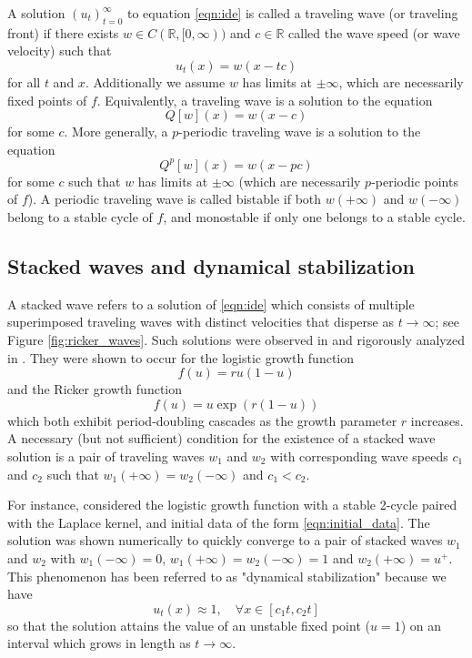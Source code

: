 \documentclass{article}
\theoremstyle{definition}
\numberwithin{equation}{section}
\begin{document}
A solution $(u_t)_{t=0}^{\infty}$ to equation \eqref{eqn:ide} is called a traveling wave (or traveling front) if there exists $w \in C(\mathbb{R},[0,\infty))$ and $c \in \mathbb{R}$ called the wave speed (or wave velocity) such that
\begin{equation} \label{eqn:tw1}
u_t(x) = w(x-tc)
\end{equation}
for all $t$ and $x$. Additionally we assume $w$ has limits at $\pm\infty$, which are necessarily fixed points of $f$. Equivalently, a traveling wave is a solution to the equation
\begin{equation} \label{eqn:tw2}
Q[w](x) = w(x-c)
\end{equation}
for some $c$. More generally, a $p$-periodic traveling wave is a solution to the equation
\begin{equation} \label{eqn:ptw}
Q^p[w](x) = w(x-pc)
\end{equation}
for some $c$ such that $w$ has limits at $\pm\infty$ (which are necessarily $p$-periodic points of $f$).
A periodic traveling wave is called bistable if both $w(+\infty)$ and $w(-\infty)$ belong to a stable cycle of $f$, and monostable if only one belongs to a stable cycle.

\subsection{Stacked waves and dynamical stabilization}

A stacked wave refers to a solution of \eqref{eqn:ide} which consists of multiple superimposed traveling waves with distinct velocities that disperse as $t \to \infty$; see Figure \ref{fig:ricker_waves}.
Such solutions were observed in \cite{kot1992} and rigorously analyzed in \cite{bourgeois2020}.
They were shown to occur for the logistic growth function
\begin{equation} \label{eqn:logistic}
f(u)=ru(1-u)
\end{equation}
and the Ricker growth function
\begin{equation} \label{eqn:ricker}
f(u)=u\exp(r(1-u))
\end{equation}
which both exhibit period-doubling cascades as the growth parameter $r$ increases.
A necessary (but not sufficient) condition for the existence of a stacked wave solution is a pair of traveling waves $w_1$ and $w_2$ with corresponding wave speeds $c_1$ and $c_2$ such that $w_1(+\infty) = w_2(-\infty)$ and $c_1 < c_2$.

For instance, \cite{kot1992} considered the logistic growth function with a stable 2-cycle paired with the Laplace kernel, and initial data of the form \eqref{eqn:initial_data}. The solution was shown numerically to quickly converge to a pair of stacked waves $w_1$ and $w_2$ with $w_1(-\infty)=0$, $w_1(+\infty)=w_2(-\infty)=1$ and $w_2(+\infty)=u^+$. This phenomenon has been referred to as "dynamical stabilization" because we have
$$
u_t(x) \approx 1, \quad \forall x \in [c_1t,c_2t]
$$
so that the solution attains the value of an unstable fixed point ($u=1$) on an interval which grows in length as $t \to \infty$.
\end{document}
